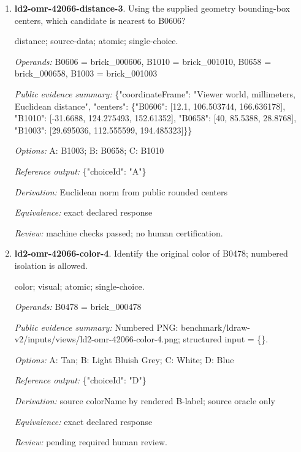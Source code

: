 \begin{enumerate}
\par{\small shape-match; visual; atomic; single-choice.\par\textit{Operands:} B0606 = brick\_000606, B0435 = brick\_000435, B1052 = brick\_001052, B0302 = brick\_000302, B1082 = brick\_001082\par\textit{Public evidence summary:} Numbered PNG: benchmark/ldraw-v2/inputs/views/ld2-omr-42066-shape-match-3.png; structured input = \{\}.\par\textit{Options:} A: B0302; B: B1082; C: B1052; D: B0435\par\textit{Reference output:} \{"choiceId": "B"\}\par\textit{Derivation:} source partNumber equality across labeled candidates; source oracle only\par\textit{Equivalence:} same source partNumber; ignore color and pose; perceptual equivalence pending\par\textit{Review:} pending required human review.}
\item \textbf{ld2-omr-42066-distance-3}. Using the supplied geometry bounding-box centers, which candidate is nearest to B0606?
\par{\small distance; source-data; atomic; single-choice.\par\textit{Operands:} B0606 = brick\_000606, B1010 = brick\_001010, B0658 = brick\_000658, B1003 = brick\_001003\par\textit{Public evidence summary:} \{"coordinateFrame": "Viewer world, millimeters, Euclidean distance", "centers": \{"B0606": [12.1, 106.503744, 166.636178], "B1010": [-31.6688, 124.275493, 152.61352], "B0658": [40, 85.5388, 28.8768], "B1003": [29.695036, 112.555599, 194.485323]\}\}\par\textit{Options:} A: B1003; B: B0658; C: B1010\par\textit{Reference output:} \{"choiceId": "A"\}\par\textit{Derivation:} Euclidean norm from public rounded centers\par\textit{Equivalence:} exact declared response\par\textit{Review:} machine checks passed; no human certification.}
\item \textbf{ld2-omr-42066-color-4}. Identify the original color of B0478; numbered isolation is allowed.
\par{\small color; visual; atomic; single-choice.\par\textit{Operands:} B0478 = brick\_000478\par\textit{Public evidence summary:} Numbered PNG: benchmark/ldraw-v2/inputs/views/ld2-omr-42066-color-4.png; structured input = \{\}.\par\textit{Options:} A: Tan; B: Light Bluish Grey; C: White; D: Blue\par\textit{Reference output:} \{"choiceId": "D"\}\par\textit{Derivation:} source colorName by rendered B-label; source oracle only\par\textit{Equivalence:} exact declared response\par\textit{Review:} pending required human review.}

\end{enumerate}
